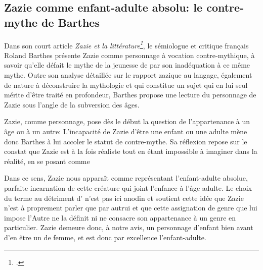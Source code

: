 \subsection{Zazie comme enfant-adulte absolu: le contre-mythe de Barthes}
Dans son court article \textit{Zazie et la littérature\footcite{Barthes1964}}, le sémiologue et critique français Roland Barthes présente Zazie comme personnage à vocation contre-mythique, à savoir qu'elle défait le mythe de la jeunesse de par son inadéquation à ce même mythe.
Outre son analyse détaillée sur le rapport zazique au langage, également de nature à déconstruire la mythologie et qui constitue un sujet qui en lui seul mérite d'être traité en profondeur, Barthes propose une lecture du personnage de Zazie sous l'angle de la subversion des âges.
\par
Zazie, comme personnage, pose dès le début la question de l'appartenance à un âge ou à un autre: 
L'incapacité de Zazie d'être une enfant ou une adulte mène donc Barthes à lui accoler le statut de contre-mythe.
Sa réflexion repose sur le constat que Zazie est à la fois réaliste tout en étant impossible à imaginer dans la réalité, en se posant comme 
\par
Dans ce sens, Zazie nous apparaît comme représentant l'enfant-adulte absolue, parfaite incarnation de cette créature qui joint l'enfance à l'âge adulte.
Le choix du terme  au détriment d' n'est pas ici anodin et soutient cette idée que Zazie n'est à proprement parler  que par autrui et que cette assignation de genre que lui impose l'Autre ne la définit ni ne consacre son appartenance à un genre en particulier.
Zazie demeure donc, à notre avis, un personnage d'enfant bien avant d'en être un de femme, et est donc par excellence l'enfant-adulte.


